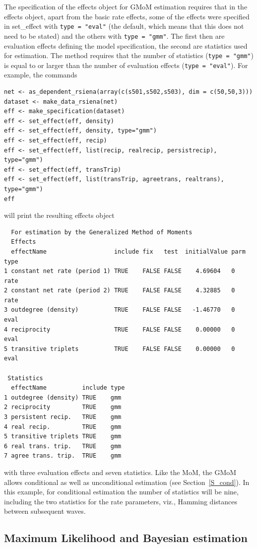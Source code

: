 \documentclass[a4paper,fleqn,11pt]{article}
\newcommand{\+}{\, + \,}
\newcommand{\sfn}[1]{\textsf{#1}}
\begin{document}
The specification of the effects object for GMoM estimation requires
that in the effects object, apart from the basic rate effects,
some of the effects were specified
in  \sfn{set\_effect} with \texttt{type = "eval"}
(the default, which means that this does not need to be stated)
and the others with \texttt{type = "gmm"}.
The first then are evaluation effects defining the model specification,
the second are statistics used for estimation.
The method requires that the number of statistics (\texttt{type = "gmm"})
is equal to or larger than the number of
evaluation effects (\texttt{type = "eval"}).
For example, the commands

\begin{verbatim}
net <- as_dependent_rsiena(array(c(s501,s502,s503), dim = c(50,50,3)))
dataset <- make_data_rsiena(net)
eff <- make_specification(dataset)
eff <- set_effect(eff, density)
eff <- set_effect(eff, density, type="gmm")
eff <- set_effect(eff, recip)
eff <- set_effect(eff, list(recip, realrecip, persistrecip), type="gmm")
eff <- set_effect(eff, transTrip)
eff <- set_effect(eff, list(transTrip, agreetrans, realtrans), type="gmm")
eff
\end{verbatim}
will print the resulting effects object
\begin{verbatim}
  For estimation by the Generalized Method of Moments
  Effects
  effectName                   include fix   test  initialValue parm type
1 constant net rate (period 1) TRUE    FALSE FALSE    4.69604   0    rate
2 constant net rate (period 2) TRUE    FALSE FALSE    4.32885   0    rate
3 outdegree (density)          TRUE    FALSE FALSE   -1.46770   0    eval
4 reciprocity                  TRUE    FALSE FALSE    0.00000   0    eval
5 transitive triplets          TRUE    FALSE FALSE    0.00000   0    eval

 Statistics
  effectName          include type
1 outdegree (density) TRUE    gmm
2 reciprocity         TRUE    gmm
3 persistent recip.   TRUE    gmm
4 real recip.         TRUE    gmm
5 transitive triplets TRUE    gmm
6 real trans. trip.   TRUE    gmm
7 agree trans. trip.  TRUE    gmm
\end{verbatim}
with three evaluation effects and seven statistics.
Like the MoM, the GMoM allows conditional as well as unconditional
estimation (see Section~\ref{S_cond}).
In this example, for conditional estimation the number
of statistics will be nine, including the two statistics
for the rate parameters, viz., Hamming distances
between subsequent waves.

\subsection{Maximum Likelihood and Bayesian estimation}
\label{S_ML}
\label{S_Bayes}
\end{document}
